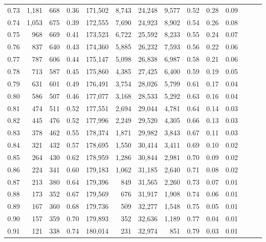 \begin{tabular}{rrrrrrrrrrrrrr}
0.73 &  1,181 &  668 &  0.36 &  171,502 &    8,743 &  24,248 &   9,577 &  0.52 &  0.28 &      0.09 \\
0.74 &  1,053 &  675 &  0.39 &  172,555 &    7,690 &  24,923 &   8,902 &  0.54 &  0.26 &      0.08 \\
0.75 &    968 &  669 &  0.41 &  173,523 &    6,722 &  25,592 &   8,233 &  0.55 &  0.24 &      0.07 \\
0.76 &    837 &  640 &  0.43 &  174,360 &    5,885 &  26,232 &   7,593 &  0.56 &  0.22 &      0.06 \\
0.77 &    787 &  606 &  0.44 &  175,147 &    5,098 &  26,838 &   6,987 &  0.58 &  0.21 &      0.06 \\
0.78 &    713 &  587 &  0.45 &  175,860 &    4,385 &  27,425 &   6,400 &  0.59 &  0.19 &      0.05 \\
0.79 &    631 &  601 &  0.49 &  176,491 &    3,754 &  28,026 &   5,799 &  0.61 &  0.17 &      0.04 \\
0.80 &    586 &  507 &  0.46 &  177,077 &    3,168 &  28,533 &   5,292 &  0.63 &  0.16 &      0.04 \\
0.81 &    474 &  511 &  0.52 &  177,551 &    2,694 &  29,044 &   4,781 &  0.64 &  0.14 &      0.03 \\
0.82 &    445 &  476 &  0.52 &  177,996 &    2,249 &  29,520 &   4,305 &  0.66 &  0.13 &      0.03 \\
0.83 &    378 &  462 &  0.55 &  178,374 &    1,871 &  29,982 &   3,843 &  0.67 &  0.11 &      0.03 \\
0.84 &    321 &  432 &  0.57 &  178,695 &    1,550 &  30,414 &   3,411 &  0.69 &  0.10 &      0.02 \\
0.85 &    264 &  430 &  0.62 &  178,959 &    1,286 &  30,844 &   2,981 &  0.70 &  0.09 &      0.02 \\
0.86 &    224 &  341 &  0.60 &  179,183 &    1,062 &  31,185 &   2,640 &  0.71 &  0.08 &      0.02 \\
0.87 &    213 &  380 &  0.64 &  179,396 &      849 &  31,565 &   2,260 &  0.73 &  0.07 &      0.01 \\
0.88 &    173 &  352 &  0.67 &  179,569 &      676 &  31,917 &   1,908 &  0.74 &  0.06 &      0.01 \\
0.89 &    167 &  360 &  0.68 &  179,736 &      509 &  32,277 &   1,548 &  0.75 &  0.05 &      0.01 \\
0.90 &    157 &  359 &  0.70 &  179,893 &      352 &  32,636 &   1,189 &  0.77 &  0.04 &      0.01 \\
0.91 &    121 &  338 &  0.74 &  180,014 &      231 &  32,974 &     851 &  0.79 &  0.03 &      0.01 \\

\end{tabular}
